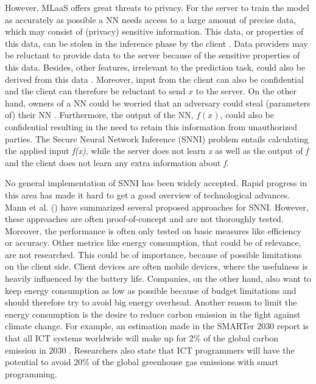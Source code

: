\documentclass[../thesis.tex]{subfiles}
\begin{document}
However, MLaaS offers great threats to privacy. For the server to train the model as accurately as possible a NN needs access to a large amount of precise data, which may consist of (privacy) sensitive information. This data, or properties of this data, can be stolen in the inference phase by the client \parencite{qayyum2020}. Data providers may be reluctant to provide data to the server because of the sensitive properties of this data. Besides, other features, irrelevant to the prediction task, could also be derived from this data \parencite{nasr2019}. Moreover, input from the client can also be confidential and the client can therefore be reluctant to send $x$ to the server. On the other hand, owners of a NN could be worried that an adversary could steal (parameters of) their NN \parencite{qayyum2020}. Furthermore, the output of the NN, $f(x)$, could also be confidential resulting in the need to retain this information from unauthorized parties. The Secure Neural Network Inference (SNNI) problem entails calculating the applied input \textit{f(x)}, while the server does not learn \textit{x} as well as the output of \textit{f} and the client does not learn any extra information about \textit{f}. 


No general implementation of SNNI has been widely accepted. Rapid progress in this area has made it hard to get a good overview of technological advances. Mann et al. (\citeyear{mann22}) have summarized several proposed approaches for SNNI. However, these approaches are often proof-of-concept and are not thoroughly tested. Moreover, the performance is often only tested on basic measures like efficiency or accuracy. Other metrics like energy consumption, that could be of relevance, are not researched. This could be of importance, because of possible limitations on the client side. Client devices are often mobile devices, where the usefulness is heavily influenced by the battery life. Companies, on the other hand, also want to keep energy consumption as low as possible because of budget limitations and should therefore try to avoid big energy overhead. Another reason to limit the energy consumption is the desire to reduce carbon emission in the fight against climate change. For example, an estimation made in the SMARTer 2030 report is that all ICT systems worldwide will make up for 2\% of the global carbon emission in 2030 \parencite{smarter2015}. Researchers also state that ICT programmers will have the potential to avoid 20\% of the global greenhouse gas emissions with smart programming. 
\end{document}
